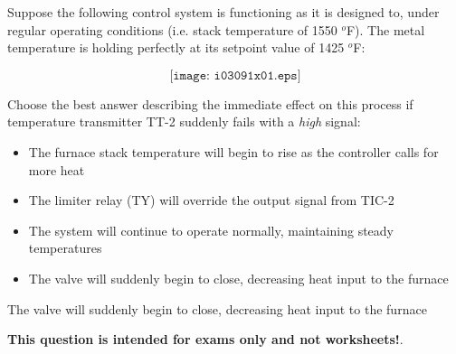 

Suppose the following control system is functioning as it is designed to, under regular operating conditions (i.e. stack temperature of 1550 $^{o}$F).  The metal temperature is holding perfectly at its setpoint value of 1425 $^{o}$F:

$$\texttt{[image: i03091x01.eps]}$$

\noindent
Choose the best answer describing the immediate effect on this process if temperature transmitter TT-2 suddenly fails with a {\it high} signal:

\begin{itemize}
\item{} The furnace stack temperature will begin to rise as the controller calls for more heat
\vskip 10pt
\item{} The limiter relay (TY) will override the output signal from TIC-2
\vskip 10pt
\item{} The system will continue to operate normally, maintaining steady temperatures
\vskip 10pt
\item{} The valve will suddenly begin to close, decreasing heat input to the furnace
\end{itemize}







The valve will suddenly begin to close, decreasing heat input to the furnace







{\bf This question is intended for exams only and not worksheets!}.



